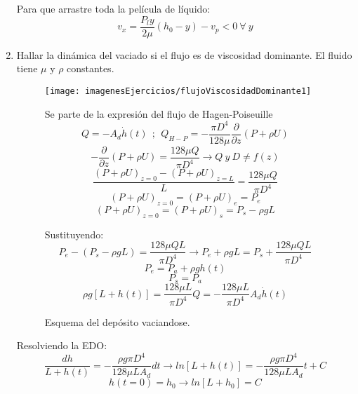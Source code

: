 \begin{enumerate}
	
	Para que arrastre toda la película de líquido:
	\[v_x=\dfrac{P_l y}{2\mu}\left(h_0-y\right)-v_p < 0 \ \forall \ y\]
	\black
	\item Hallar la dinámica del vaciado si el flujo es de viscosidad dominante. El fluido tiene $\mu$ y $\rho$ constantes.
	\begin{figure}[H]
		\begin{minipage}{0.45\textwidth}
			\centering
			\texttt{[image: imagenesEjercicios/flujoViscosidadDominante1]}
			\caption{Esquema del depósito vaciandose.}
			\label{fig:flujoviscosidaddominante1}
		\end{minipage}%
		\begin{minipage}{0.55\textwidth}
			\blue
			Se parte de la expresión del flujo de Hagen-Poiseuille
			\[Q=-A_d \dot{h}(t) \ \ ; \ \ Q_{H-P}=-\dfrac{\pi D^4}{128 \mu}\dfrac{\partial}{\partial z}\left(P+\rho U\right)\]
			\[-\dfrac{\partial}{\partial z}\left(P+\rho U\right)=\dfrac{128 \mu Q}{\pi D^4}\rightarrow Q \ y \ D \ne f(z)\]
			\[\dfrac{\left(P+\rho  U\right)_{z=0}-\left(P+\rho  U\right)_{z=L}}{L}=\dfrac{128 \mu Q}{\pi D^4}\]
			\[\left(P+\rho  U\right)_{z=0}=\left(P+\rho  U\right)_{e}=P_e\]
			\[\left(P+\rho  U\right)_{z=0}=\left(P+\rho  U\right)_{s}=P_s-\rho g L\]
		
			
			Sustituyendo:
			\[P_e-\left(P_s-\rho g L\right)=\dfrac{128 \mu QL}{\pi D^4}\rightarrow P_e+\rho g L=P_s+\dfrac{128 \mu QL}{\pi D^4}\]
				\[P_e=P_a+\rho g h(t)\]
			\[P_s=P_a\]
			\[\rho g\left[L+h(t)\right]=\dfrac{128 \mu L}{\pi D^4}Q=-\dfrac{128 \mu L}{\pi D^4}A_d \dot{h}(t)\]
		\end{minipage}
	\end{figure}
	\blue
	Resolviendo la EDO:
	\[\dfrac{dh}{L+h(t)}=-\dfrac{\rho g\pi D^4}{128 \mu L A_d }dt
	\rightarrow
	 ln\left[L+h(t)\right]=-\dfrac{\rho g\pi D^4}{128 \mu L A_d }t +C\]
	\[h(t=0)=h_0 \rightarrow ln\left[L+h_0\right]=C\]
	

\end{enumerate}
